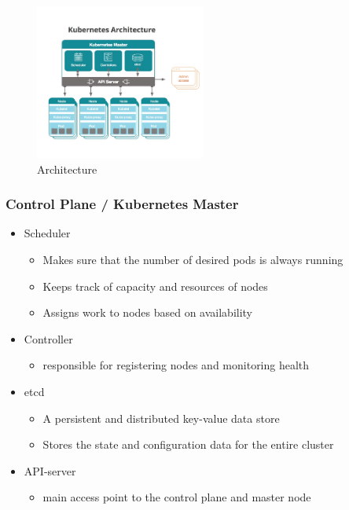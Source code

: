 \documentclass{article}
\begin{document}
\begin{figure}[H]
    \centering
    \includegraphics[width=0.5\textwidth]{img/kubernetes-architecture.png}
    \caption{Architecture}
\end{figure}

\subsubsection{Control Plane / Kubernetes Master}

\begin{itemize}
    \item Scheduler
    \begin{itemize}
        \item Makes sure that the number of desired pods is always running
        \item Keeps track of capacity and resources of nodes
        \item Assigns work to nodes based on availability
    \end{itemize}
    \item Controller
    \begin{itemize}
        \item responsible for registering nodes and monitoring health
    \end{itemize}
    \item etcd
    \begin{itemize}
        \item A persistent and distributed key-value data store
        \item Stores the state and configuration data for the entire cluster
    \end{itemize}
    \item API-server
    \begin{itemize}
        \item main access point to the control plane and master node
    \end{itemize}
\end{itemize}
\end{document}
